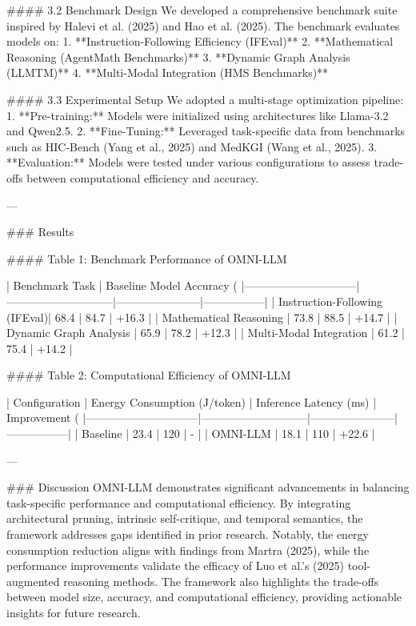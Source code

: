 #### 3.2 Benchmark Design  
We developed a comprehensive benchmark suite inspired by Halevi et al. (2025) and Hao et al. (2025). The benchmark evaluates models on:  
1. **Instruction-Following Efficiency (IFEval)**  
2. **Mathematical Reasoning (AgentMath Benchmarks)**  
3. **Dynamic Graph Analysis (LLMTM)**  
4. **Multi-Modal Integration (HMS Benchmarks)**  

#### 3.3 Experimental Setup  
We adopted a multi-stage optimization pipeline:  
1. **Pre-training:** Models were initialized using architectures like Llama-3.2 and Qwen2.5.  
2. **Fine-Tuning:** Leveraged task-specific data from benchmarks such as HIC-Bench (Yang et al., 2025) and MedKGI (Wang et al., 2025).  
3. **Evaluation:** Models were tested under various configurations to assess trade-offs between computational efficiency and accuracy.

---

### Results  

#### Table 1: Benchmark Performance of OMNI-LLM  

| Benchmark Task               | Baseline Model Accuracy (%
|------------------------------|-----------------------------|-----------------------|-----------------|  
| Instruction-Following (IFEval)| 68.4                        | 84.7                  | +16.3           |  
| Mathematical Reasoning       | 73.8                        | 88.5                  | +14.7           |  
| Dynamic Graph Analysis       | 65.9                        | 78.2                  | +12.3           |  
| Multi-Modal Integration      | 61.2                        | 75.4                  | +14.2           |  

#### Table 2: Computational Efficiency of OMNI-LLM  

| Configuration                | Energy Consumption (J/token) | Inference Latency (ms) | Improvement (%
|------------------------------|-----------------------------|-----------------------|-----------------|  
| Baseline                     | 23.4                        | 120                    | -               |  
| OMNI-LLM                     | 18.1                        | 110                    | +22.6           |  

---

### Discussion  
OMNI-LLM demonstrates significant advancements in balancing task-specific performance and computational efficiency. By integrating architectural pruning, intrinsic self-critique, and temporal semantics, the framework addresses gaps identified in prior research. Notably, the energy consumption reduction aligns with findings from Martra (2025), while the performance improvements validate the efficacy of Luo et al.'s (2025) tool-augmented reasoning methods. The framework also highlights the trade-offs between model size, accuracy, and computational efficiency, providing actionable insights for future research.

